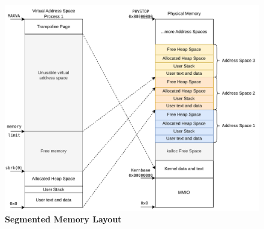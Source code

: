 
\begin{figure}[ht!]
    \centering
    \includegraphics[]{figures/segmented_layout.pdf}
    \caption[Segmented Memory Layout]{\textbf{Segmented Memory Layout}}
    \label{fig:theory:segLayout}
\end{figure}


